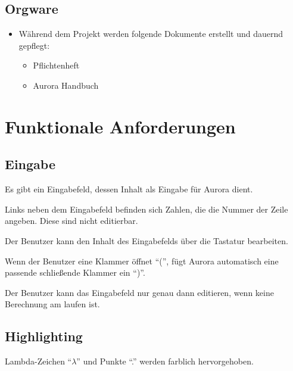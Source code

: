\documentclass[parskip=full,11pt,twoside]{scrartcl}
\begin{document}
\subsection{Orgware}
	\begin{itemize}
		\item Während dem Projekt werden folgende Dokumente erstellt und dauernd gepflegt:
			\begin{itemize}
				\item Pflichtenheft
				\item Aurora Handbuch
			\end{itemize}
	\end{itemize}
\newpage


\section{Funktionale Anforderungen}

\subsection{Eingabe}

Es gibt ein Eingabefeld, dessen Inhalt als Eingabe für Aurora dient.

Links neben dem Eingabefeld befinden sich Zahlen, die die Nummer der Zeile angeben. Diese sind nicht editierbar.

Der Benutzer kann den Inhalt des Eingabefelds über die Tastatur bearbeiten.

Wenn der Benutzer eine Klammer öffnet \enquote{(}, fügt Aurora automatisch eine passende schließende Klammer ein \enquote{)}.

Der Benutzer kann das Eingabefeld nur genau dann editieren, wenn keine Berechnung am laufen ist.




\subsection{Highlighting}

Lambda-Zeichen \enquote{$\lambda$} und Punkte \enquote{.} werden farblich hervorgehoben.
\end{document}
